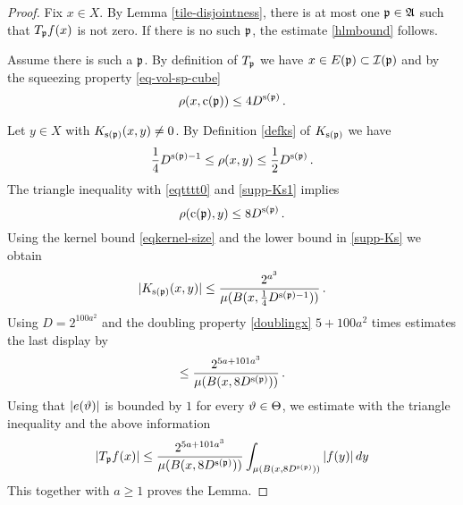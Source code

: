 {\begin{proof}
Fix $x\in X$.  By Lemma \ref{tile-disjointness}, there is at most one ${\mathfrak p} \in \mathfrak{A}$
such that
 $T_{{\mathfrak p}} f(x)$ is not zero.
 If there is no such ${\mathfrak p}$, the estimate \eqref{hlmbound} follows.

 Assume there is such a ${\mathfrak p}$.
 By definition of $T_{{\mathfrak p}}$ we have $x\in E({\mathfrak p})\subset {\mathcal{I}}({\mathfrak p})$ and  by the squeezing property \eqref{eq-vol-sp-cube}
\begin{equation}\label{eqtttt0}
    \rho(x, {\mathrm{c}}({\mathfrak p}))\le 4D^{{\mathrm{s}}({\mathfrak p})}\, .
\end{equation}

Let $y\in X$ with  $K_{{\mathrm{s}}({\mathfrak p})}(x,y)\neq 0$. By Definition \eqref{defks} of $K_{{\mathrm{s}}({\mathfrak p})}$
we have
\begin{equation}\label{supp-Ks1}
   \frac{1}{4} D^{{\mathrm{s}}({\mathfrak p})-1}
   \leq \rho(x,y) \leq \frac{1}{2} D^{{\mathrm{s}}({\mathfrak p})}\, .
\end{equation}
The triangle inequality with \eqref{eqtttt0} and \eqref{supp-Ks1} implies
\begin{equation}
    \rho({\mathrm{c}}({\mathfrak p}),y)\le 8D^{{\mathrm{s}}({\mathfrak p})}\, .
\end{equation}
Using the kernel bound \eqref{eqkernel-size} and the lower bound in \eqref{supp-Ks}
we obtain
\begin{equation}
|K_{{\mathrm{s}}({\mathfrak p})}(x,y)|\le \frac{2^{a^3}}{\mu(B(x,\frac 14 D^{{{\mathrm{s}}({\mathfrak p})}-1}))}\, .
\end{equation}
Using $D=2^{100a^2}$
and the doubling property \eqref{doublingx} $5 +100a^2$ times estimates
the last display by
\begin{equation}
\le \frac{2^{5a+101a^3}}{\mu(B(x,  8D^{{\mathrm{s}}({\mathfrak p})}))}\, .
\end{equation}
 Using that {$|e({\vartheta})|$} is bounded by $1$
for every ${\vartheta}\in {\Theta}$, we estimate with the triangle inequality and the above information
 \begin{equation}
  | T_{{\mathfrak p}} f(x)|
    \le \frac{2^{5a+101 a^3}}{\mu(B(x, 8D^{{\mathrm{s}}({\mathfrak p})}))} \int _{\mu(B(x, 8D^{{\mathrm{s}}({\mathfrak p})}))} |f(y)|\, dy   \end{equation}
This together with $a\ge 1$ proves the Lemma.
\end{proof}

}
